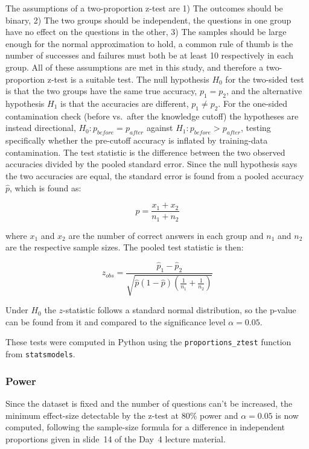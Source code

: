 \documentclass{article}
\begin{document}
The assumptions of a two-proportion z-test are 1) The outcomes should be binary, 2) The two groups should be independent, the questions in one group have no effect on the questions in the other, 3) The samples should be large enough for the normal approximation to hold, a common rule of thumb is the number of successes and failures must both be at least 10 respectively in each group. All of these assumptions are met in this study, and therefore a two-proportion z-test is a suitable test.\newline
\newline
The null hypothesis $H_0$ for the two-sided test is that the two groups have the same true accuracy, $p_1 = p_2$, and the alternative hypothesis $H_1$ is that the accuracies are different, $p_1 \neq p_2$. For the one-sided contamination check (before vs.\ after the knowledge cutoff) the hypotheses are instead directional, $H_0: p_{before} = p_{after}$ against $H_1: p_{before} > p_{after}$, testing specifically whether the pre-cutoff accuracy is inflated by training-data contamination.\newline
The test statistic is the difference between the two observed accuracies divided by the pooled standard error. Since the null hypothesis says the two accuracies are equal, the standard error is found from a pooled accuracy $\hat{p}$, which is found as:

$$\hat{p} = \frac{x_1 + x_2}{n_1 + n_2}$$

where $x_1$ and $x_2$ are the number of correct answers in each group and $n_1$ and $n_2$ are the respective sample sizes. The pooled test statistic is then:

$$z_{obs} = \frac{\hat{p}_1 - \hat{p}_2}{\sqrt{\hat{p}(1 - \hat{p})\left(\frac{1}{n_1} + \frac{1}{n_2}\right)}}$$

Under $H_0$ the $z$-statistic follows a standard normal distribution, so the p-value can be found from it and compared to the significance level $\alpha = 0.05$.

These tests were computed in Python using the \texttt{proportions\_ztest} function from \texttt{statsmodels}.

\subsubsection{Power}

Since the dataset is fixed and the number of questions can't be increased, the minimum effect-size detectable by the z-test at 80\% power and $\alpha = 0.05$ is now computed, following the sample-size formula for a difference in independent proportions given in slide~14 of the Day~4 lecture material\supercite{das2026day4}.
\end{document}
